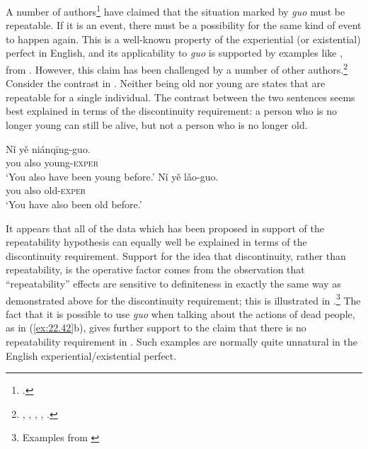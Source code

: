 A number of authors\footnote{\textcites{Ma1977}[230]{LiThompson1981}{Yeh1996}[268]{Smith1997}.} have claimed that the situation marked by \textit{guo} must be repeatable. If it is an event, there must be a possibility for the same kind of event to happen again. This is a well-known property of the experiential (or existential) perfect in English, and its applicability to \textit{guo} is supported by examples like , from \citet[15]{Ma1977}. However, this claim has been challenged by a number of other authors.\footnote{\citet{Chen1979}, \citet{Iljic1990}, \citet[147--148]{XiaoMcEnery2004},  \citet{PanLee2004}, \citet{Lin2007}.} Consider the contrast in . Neither being old nor young are states that are repeatable for a single individual. The contrast between the two sentences seems best explained in terms of the discontinuity requirement: a person who is no longer young can still be alive, but not a person who is no longer old.


\z

\ea \label{ex:22.41}
\ea  \gll Nǐ  yě  niánqīng-guo.\\
you  also  young-\textsc{exper}\\
\glt ‘You also have been young before.’ 
\ex \gll *Nǐ  yě  lǎo-guo.\\
you  also  old-\textsc{exper}\\
\glt ‘You have also been old before.’
\z \z


It appears that all of the data which has been proposed in support of the repeatability hypothesis can equally well be explained in terms of the discontinuity requirement. Support for the idea that discontinuity, rather than repeatability, is the operative factor comes from the observation that “repeatability” effects are sensitive to definiteness in exactly the same way as demonstrated above for the discontinuity requirement; this is illustrated in .\footnote{Examples from \citet[153, 163]{Yeh1996}} The fact that it is possible to use \textit{guo} when talking about the actions of dead people, as in (\ref{ex:22.42}b), gives further support to the claim that there is no repeatability requirement in . Such examples are normally quite unnatural in the English experiential/existential perfect.



